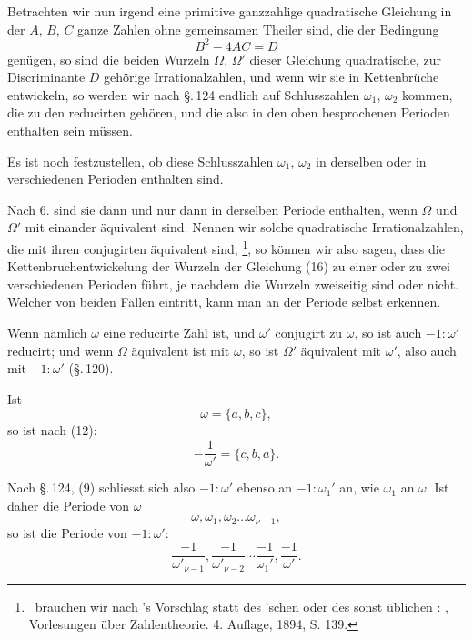 Betrachten wir nun irgend eine primitive ganzzahlige quadratische
 Gleichung
in der $A$, $B$, $C$ ganze Zahlen ohne gemeinsamen Theiler sind,
die der Bedingung
\[
B^2 - 4AC = D
\]
genügen, so sind die beiden Wurzeln $\Omega$, $\Omega'$ dieser Gleichung
quadratische, zur Discriminante $D$ gehörige Irrationalzahlen, und
wenn wir sie in Kettenbrüche entwickeln, so werden wir nach
\S.\,124 endlich auf Schlusszahlen $\omega_1$, $\omega_2$ kommen, die zu den reducirten
 gehören, und die also in den oben besprochenen Perioden
enthalten sein müssen.

Es ist noch festzustellen, ob diese Schlusszahlen $\omega_1$, $\omega_2$ in
derselben oder in verschiedenen Perioden enthalten sind.

Nach 6. sind sie dann und nur dann in derselben Periode
enthalten, wenn $\Omega$ und $\Omega'$ mit einander äquivalent sind. Nennen
wir solche quadratische Irrationalzahlen, die mit ihren conjugirten
 äquivalent sind, \footnote{\glqq{}\grqq\ brauchen wir nach 's Vorschlag statt des
'schen  oder des sonst üblichen : , Vorlesungen über Zahlentheorie. 4. Auflage, 1894, S. 139.}, so können wir
also sagen, dass die Kettenbruchentwickelung der Wurzeln der
Gleichung (16) zu einer oder zu zwei verschiedenen Perioden
führt, je nachdem die Wurzeln zweiseitig sind oder nicht.
Welcher von beiden Fällen eintritt, kann man an der Periode
selbst erkennen.

Wenn nämlich $\omega$ eine reducirte Zahl ist, und $\omega'$ conjugirt
zu $\omega$, so ist auch $-1 : \omega'$ reducirt; und wenn $\Omega$ äquivalent ist
mit $\omega$, so ist $\Omega'$ äquivalent mit $\omega'$, also auch mit $-1 : \omega'$ (\S.\,120).

Ist
\[
\omega = \{a, b, c\},
\]
so ist nach (12):
\[
-\frac{1}{\omega'} = \{c, b, a\}.
\]

Nach \S.\,124, (9) schliesst sich also $-1 : \omega'$ ebenso an $-1 : \omega_1'$
an, wie $\omega_1$ an $\omega$. Ist daher die Periode von $\omega$
\[
\omega, \omega_1, \omega_2 \ldots \omega_{\nu-1},
\]
so ist die Periode von $-1 : \omega'$:
\[
\frac{-1}{\omega'_{\nu-1}}, \frac{-1}{\omega'_{\nu-2}} \cdots \frac{-1}{\omega_1'}, \frac{-1}{\omega'}.
\]
